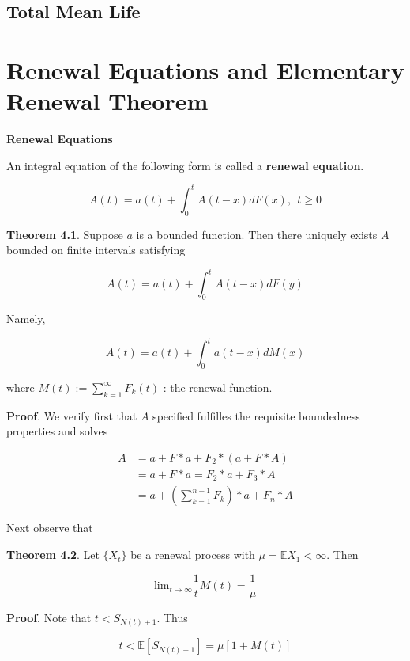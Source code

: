 \documentclass[12pt]{article}
\theoremstyle{nonumberbreak}
\begin{document}
\subsection{Total Mean Life}


\section{Renewal Equations and Elementary Renewal Theorem}


\textbf{Renewal Equations}

An integral equation of the following form is called a \textbf{renewal equation}. 

$$
A(t) = a(t) + \int_0^t A(t-x) dF(x), \ \ t \ge 0
$$






\begin{theorem}
\textbf{Theorem 4.1}. Suppose $a$ is a bounded function. Then there uniquely exists $A$ bounded on finite intervals satisfying

$$
A(t) = a(t) + \int_0^t A(t-x) dF(y)
$$


Namely, 

$$
A(t) = a(t) + \int_0^t a(t-x) dM(x)
$$

where $M(t) := \sum_{k=1}^\infty F_k(t)$ : the renewal function. 
\end{theorem}


\textbf{Proof}. We verify first that $A$ specified fulfilles the requisite boundedness properties and solves 



$$
\begin{aligned}
A &= a + F \ast a + F_2 \ast (a + F \ast A) \\[8pt]
&= a + F \ast a = F_2 \ast a + F_3 \ast A \\[8pt]
&= a + \left( \sum_{k=1}^{n-1} F_k \right) \ast a + F_n \ast A
\end{aligned}
$$


Next observe that 


\begin{theorem}
\textbf{Theorem 4.2}. Let $\{ X_t \}$ be a renewal process with $\mu = \mathbb{E} X_1 < \infty$. Then

$$
\mathrm{lim}_{t \to \infty} \frac{1}{t} M(t) = \frac{1}{\mu}
$$
\end{theorem}


\textbf{Proof}. Note that $t < S_{N(t) + 1}$. Thus 

$$
t < \mathbb{E} \left[ S_{N(t) + 1} \right] = \mu \left[ 1 + M(t) \right]
$$
\end{document}

